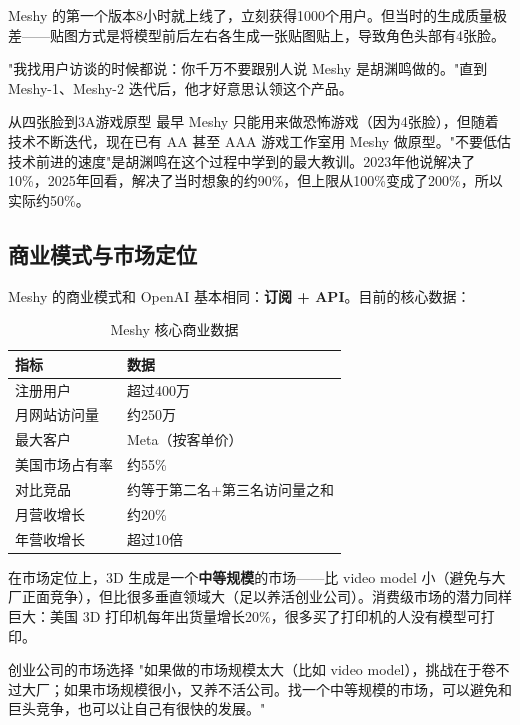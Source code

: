 Meshy 的第一个版本8小时就上线了，立刻获得1000个用户。但当时的生成质量极差——贴图方式是将模型前后左右各生成一张贴图贴上，导致角色头部有4张脸。

"我找用户访谈的时候都说：你千万不要跟别人说 Meshy 是胡渊鸣做的。"直到 Meshy-1、Meshy-2 迭代后，他才好意思认领这个产品。

\begin{knowledgebox}{从四张脸到3A游戏原型}
最早 Meshy 只能用来做恐怖游戏（因为4张脸），但随着技术不断迭代，现在已有 AA 甚至 AAA 游戏工作室用 Meshy 做原型。"不要低估技术前进的速度"是胡渊鸣在这个过程中学到的最大教训。2023年他说解决了10\%，2025年回看，解决了当时想象的约90\%，但上限从100\%变成了200\%，所以实际约50\%。
\end{knowledgebox}

\subsection{商业模式与市场定位}

Meshy 的商业模式和 OpenAI 基本相同：\textbf{订阅 + API}。目前的核心数据：

\begin{table}[H]
\centering
\caption{Meshy 核心商业数据}
\begin{tabular}{ll}
\toprule
\textbf{指标} & \textbf{数据} \\
\midrule
注册用户 & 超过400万 \\
月网站访问量 & 约250万 \\
最大客户 & Meta（按客单价） \\
美国市场占有率 & 约55\% \\
对比竞品 & 约等于第二名+第三名访问量之和 \\
月营收增长 & 约20\% \\
年营收增长 & 超过10倍 \\
\bottomrule
\end{tabular}
\end{table}

在市场定位上，3D 生成是一个\textbf{中等规模}的市场——比 video model 小（避免与大厂正面竞争），但比很多垂直领域大（足以养活创业公司）。消费级市场的潜力同样巨大：美国 3D 打印机每年出货量增长20\%，很多买了打印机的人没有模型可打印。

\begin{warningbox}{创业公司的市场选择}
"如果做的市场规模太大（比如 video model），挑战在于卷不过大厂；如果市场规模很小，又养不活公司。找一个中等规模的市场，可以避免和巨头竞争，也可以让自己有很快的发展。"
\end{warningbox}

